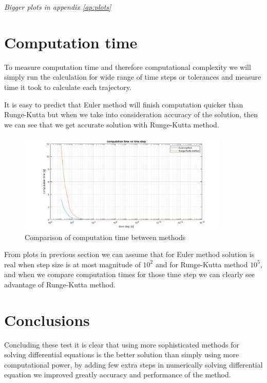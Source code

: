 \documentclass[english,12pt,a4paper, notitlepage]{report}
\begin{document}
		
	\emph{Bigger plots in appendix \ref{ap:plots}}
	
	
	
	\newpage
	
	\section{Computation time}
	
	To measure computation time and therefore computational complexity we will simply run the calculation for wide range of time steps or tolerances and measure time it took to calculate each trajectory.
	
	It is easy to predict that Euler method will finish computation quicker than Runge-Kutta but when we take into consideration accuracy of the solution, then we can see that we get accurate solution with Runge-Kutta method.  
	
	\begin{figure}[h!]
		\centering
		\includegraphics[width = 0.9\textwidth]{time_comp.png}
		\caption{Comparison of computation time between methods}
	\end{figure}
	
	From plots in previous section we can assume that for Euler method solution is real when step size is at most magnitude of $10^2$ and for Runge-Kutta method $10^5$, and when we compare computation times for those time step we can clearly see advantage of Runge-Kutta method. 
	
	\newpage
	
	\section{Conclusions}
	
	Concluding these test it is clear that using more sophisticated methods for solving differential equations is the better solution than simply using more computational power, by adding few extra steps in numerically solving differential equation we improved greatly accuracy and performance of the method.
	
\end{document}
